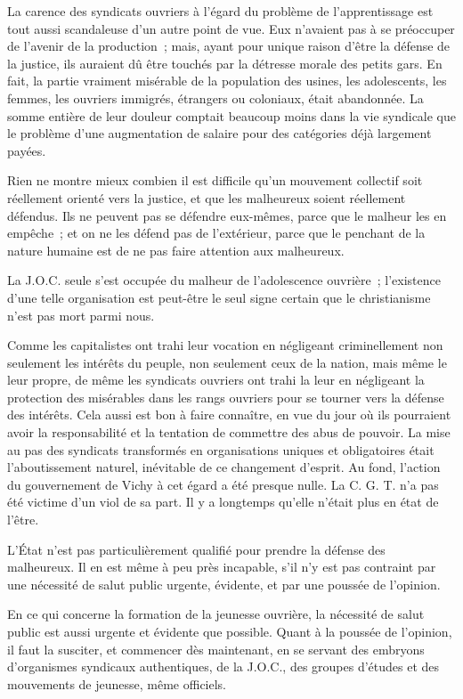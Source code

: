 \documentclass[french,twoside]{book} %
\begin{document}
La carence des syndicats ouvriers à l'égard du problème de l'apprentissage est tout aussi scandaleuse d'un autre point de vue. Eux n'avaient pas à se préoccuper de l'avenir de la production ; mais, ayant pour unique raison d'être la défense de la justice, ils auraient dû être touchés par la détresse morale des petits gars. En fait, la partie vraiment misérable de la population des usines, les adolescents, les femmes, les ouvriers immigrés, étrangers ou coloniaux, était abandonnée. La somme entière de leur douleur comptait beaucoup moins dans la vie syndicale que le problème d'une augmentation de salaire pour des catégories déjà largement payées.\par
Rien ne montre mieux combien il est difficile qu'un mouvement collectif soit réellement orienté vers la justice, et que les malheureux soient réellement défendus. Ils ne peuvent pas se défendre eux-mêmes, parce que le malheur les en empêche ; et on ne les défend pas de l'extérieur, parce que le penchant de la nature humaine est de ne pas faire attention aux malheureux.\par
La J.O.C. seule s'est occupée du malheur de l'adolescence ouvrière ; l'existence d'une telle organisation est peut-être le seul signe certain que le christianisme n'est pas mort parmi nous.\par
Comme les capitalistes ont trahi leur vocation en négligeant criminellement non seulement les intérêts du peuple, non seulement ceux de la nation, mais même le leur propre, de même les syndicats ouvriers ont trahi la leur en négligeant la protection des misérables dans les rangs ouvriers pour se tourner vers la défense des intérêts. Cela aussi est bon à faire connaître, en vue du jour où ils pourraient avoir la responsabilité et la tentation de commettre des abus de pouvoir. La mise au pas des syndicats transformés en organisations uniques et obligatoires était l'aboutissement naturel, inévitable de ce changement d'esprit. Au fond, l'action du gouvernement de Vichy à cet égard a été presque nulle. La C. G. T. n'a pas été victime d'un viol de sa part. Il y a longtemps qu'elle n'était plus en état de l'être.\par
L'État n'est pas particulièrement qualifié pour prendre la défense des malheureux. Il en est même à peu près incapable, s'il n'y est pas contraint par une nécessité de salut public urgente, évidente, et par une poussée de l'opinion.\par
En ce qui concerne la formation de la jeunesse ouvrière, la nécessité de salut public est aussi urgente et évidente que possible. Quant à la poussée de l'opinion, il faut la susciter, et commencer dès maintenant, en se servant des embryons d'organismes syndicaux authentiques, de la J.O.C., des groupes d'études et des mouvements de jeunesse, même officiels.\par
\end{document}
